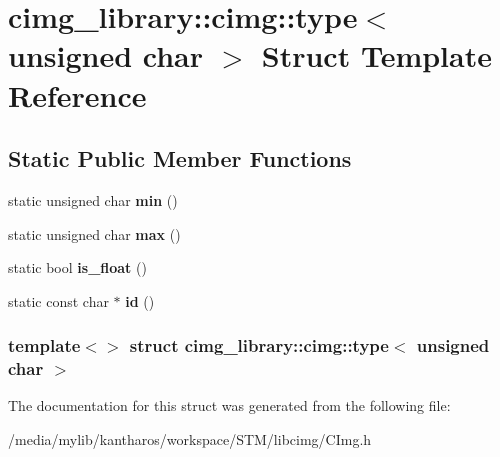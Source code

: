 \hypertarget{structcimg__library_1_1cimg_1_1type_3_01unsigned_01char_01_4}{
\section{cimg\_\-library::cimg::type$<$ unsigned char $>$ Struct Template Reference}
\label{structcimg__library_1_1cimg_1_1type_3_01unsigned_01char_01_4}
}
\subsection*{Static Public Member Functions}
\begin{DoxyCompactItemize}
\item 
\hypertarget{structcimg__library_1_1cimg_1_1type_3_01unsigned_01char_01_4_a2bd8888dcabb2d89db5236d7deebdc4e}{
static unsigned char {\bfseries min} ()}
\label{structcimg__library_1_1cimg_1_1type_3_01unsigned_01char_01_4_a2bd8888dcabb2d89db5236d7deebdc4e}

\item 
\hypertarget{structcimg__library_1_1cimg_1_1type_3_01unsigned_01char_01_4_a85d022899e295460ea70e4742e1074b7}{
static unsigned char {\bfseries max} ()}
\label{structcimg__library_1_1cimg_1_1type_3_01unsigned_01char_01_4_a85d022899e295460ea70e4742e1074b7}

\item 
\hypertarget{structcimg__library_1_1cimg_1_1type_3_01unsigned_01char_01_4_a5e790ce09f0b17fd7b1ca1b90c206148}{
static bool {\bfseries is\_\-float} ()}
\label{structcimg__library_1_1cimg_1_1type_3_01unsigned_01char_01_4_a5e790ce09f0b17fd7b1ca1b90c206148}

\item 
\hypertarget{structcimg__library_1_1cimg_1_1type_3_01unsigned_01char_01_4_a31639b0de26ee971b5a8a9509cd0be62}{
static const char $\ast$ {\bfseries id} ()}
\label{structcimg__library_1_1cimg_1_1type_3_01unsigned_01char_01_4_a31639b0de26ee971b5a8a9509cd0be62}

\end{DoxyCompactItemize}
\subsubsection*{template$<$$>$ struct cimg\_\-library::cimg::type$<$ unsigned char $>$}



The documentation for this struct was generated from the following file:\begin{DoxyCompactItemize}
\item 
/media/mylib/kantharos/workspace/STM/libcimg/CImg.h\end{DoxyCompactItemize}
